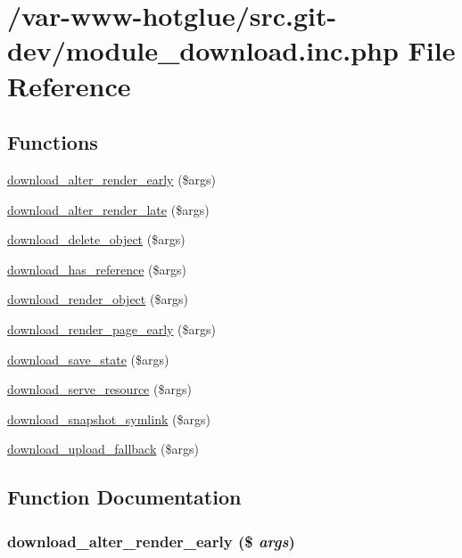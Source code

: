\hypertarget{module__download_8inc_8php}{
\section{/var-\/www-\/hotglue/src.git-\/dev/module\_\-download.inc.php File Reference}
\label{module__download_8inc_8php}
}
\subsection*{Functions}
\begin{DoxyCompactItemize}
\item 
\hyperlink{module__download_8inc_8php_a28d1b9ae20de8d1a271f15d308b1df31}{download\_\-alter\_\-render\_\-early} (\$args)
\item 
\hyperlink{module__download_8inc_8php_a61a6050abc43cf71d0ca422a9240ae7c}{download\_\-alter\_\-render\_\-late} (\$args)
\item 
\hyperlink{module__download_8inc_8php_a5fd781bf1e0393667b227abec7169b28}{download\_\-delete\_\-object} (\$args)
\item 
\hyperlink{module__download_8inc_8php_aa80da3f3fd41f7f00f97043f7a2431c8}{download\_\-has\_\-reference} (\$args)
\item 
\hyperlink{module__download_8inc_8php_a57c588f1fd0663aa16fd707a522bcc79}{download\_\-render\_\-object} (\$args)
\item 
\hyperlink{module__download_8inc_8php_ac980246bec838c65efd59bc25253b005}{download\_\-render\_\-page\_\-early} (\$args)
\item 
\hyperlink{module__download_8inc_8php_a2e9ee6868b80832b40e9072a8c644c88}{download\_\-save\_\-state} (\$args)
\item 
\hyperlink{module__download_8inc_8php_a930c9545346e8da3f3db5a97dc4d8c74}{download\_\-serve\_\-resource} (\$args)
\item 
\hyperlink{module__download_8inc_8php_ae1b136740fb3c1fe26820e1982f8d353}{download\_\-snapshot\_\-symlink} (\$args)
\item 
\hyperlink{module__download_8inc_8php_a678bcaf9018d772881b4291020894fa0}{download\_\-upload\_\-fallback} (\$args)
\end{DoxyCompactItemize}


\subsection{Function Documentation}
\hypertarget{module__download_8inc_8php_a28d1b9ae20de8d1a271f15d308b1df31}{
\subsubsection[{download\_\-alter\_\-render\_\-early}]{\setlength{\rightskip}{0pt plus 5cm}download\_\-alter\_\-render\_\-early (\$ {\em args})}}
\label{module__download_8inc_8php_a28d1b9ae20de8d1a271f15d308b1df31}


